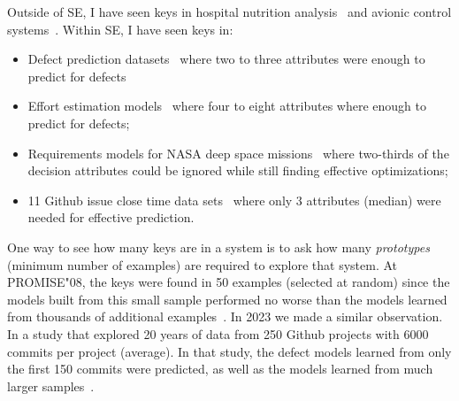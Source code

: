 \documentclass[sigconf,screen]{acmart}
\begin{document}
Outside of SE, I have seen keys in hospital nutrition analysis~\cite{partington2015reduced} and avionic control systems~\cite{gay2010automatically}. Within SE, I have seen keys in:
\begin{itemize}
 \item  
Defect prediction datasets~\cite{menzies2006data} where two to three attributes were
enough to predict for defects
\item
Effort estimation models~\cite{chen2005finding} where four to eight attributes
where enough to predict for defects;
\item 
Requirements models for NASA deep space missions~\cite{jalali2008optimizing} where
two-thirds of the decision attributes could be ignored while still finding effective 
optimizations; 
\item
11 Github issue close time data sets~\cite{rees2017better}  
where only 3 attributes (median) were needed for   effective prediction.
\end{itemize}
One way to see how many keys are in a system is to ask how many {\em prototypes} (minimum number of examples)  are required to explore that system. 
At PROMISE"08, the keys were found in 50
examples (selected at random) since the models built from this small sample performed no worse than the models learned from thousands of additional examples~\cite{menzies2008implications}.  
In 2023 we made a similar observation. 
In a study that explored 20 years of data from 250 Github projects with 6000 commits per project (average).
In that study, the defect models learned from only the first 150 commits were predicted, as well as the models learned from much larger samples~\cite{10.1145/3583565}.
\end{document}
